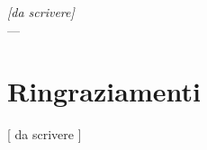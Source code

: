 \cleardoublepage
{}
{}

\begin{flushright}{
    \slshape
    [da scrivere] }\\
    \medskip
    ---
\end{flushright}

\begingroup
\let\clearpage\relax
\let\cleardoublepage\relax
\let\cleardoublepage\relax

\chapter*{Ringraziamenti}

[ da scrivere ]

\vspace{0.75cm}

\noindent{\myLocation, \myTime}
\hfill \textit{\myName}

\endgroup
